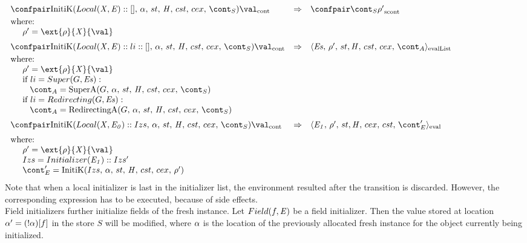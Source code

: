 \documentclass{article}
\begin{document}
\[
  \begin{array}{lcl@{\hspace{30mm}}}
	\contconf{\InitK{Local(\variablemeta, \expr) :: []}{\loc}{\scont}}{\val}
	& \Rightarrow &
	\scontconf{\scont}{\env'}\\[1mm]
	\textrm{where:}\\
	\hspace{5mm}\env' = \ext{\env}{\variablemeta}{\val}\\[2mm]

	\contconf{\InitK{Local(\variablemeta, \expr) :: li :: []}{\loc}{\scont}}{\val}
	& \Rightarrow &
	\evallistconf{\exprs}{\env'}{\strace}{\cstrace}{\cex}{\acont}\\[1mm]
	\textrm{where:}\\
	\hspace{5mm}\env' = \ext{\env}{\variablemeta}{\val}\\
	\hspace{5mm}\textrm{if } li = Super(G, \exprs):\\
	\hspace{8mm}\acont = \SuperA{G}{\loc}{\scont}\\
	\hspace{5mm}\textrm{if } li = Redirecting(G, \exprs):\\
	\hspace{8mm}\acont = \RedirectingA{G}{\loc}{\scont}\\[2mm]

	\contconf{\InitK{Local(\variablemeta, \expri{0}) :: Izs}{\loc}{\scont}}{\val}
	& \Rightarrow &
	\evalconf{\expri{1}}{\env'}{st}{cex}{cst}{\econt'}\\[2mm]
	\textrm{where:}\\
	\hspace{5mm}\env' = \ext{\env}{\variablemeta}{\val}\\
	\hspace{5mm}Izs = Initializer(\expri{1}) :: Izs'\\
	\hspace{5mm}\econt' = \InitK{Izs}{\loc}{\env'}
  \end{array}
\]
\noindent
Note that when a local initializer is last in the initializer list, the environment resulted after the transition is discarded. However, the corresponding expression has to be executed, because of side effects.
\\[2mm]
\noindent
Field initializers further initialize fields of the fresh instance. Let $Field(f, \mathit{E})$ be a field initializer. Then the value stored at location $\alpha' = (!\alpha)[f]$ in the store $S$ will be modified, where $\alpha$ is the location of the previously allocated fresh instance for the object currently being initialized.
\end{document}
